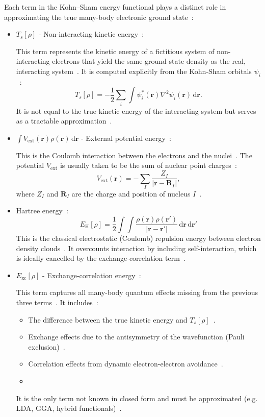 Each term in the Kohn--Sham energy functional plays a distinct role in approximating the true many-body electronic ground state~\nocite{}:
\begin{itemize}
    \item $T_s[\rho]$ - Non-interacting kinetic energy~\nocite{}:

    This term represents the kinetic energy of a fictitious system of non-interacting electrons that yield the same ground-state density as the real, interacting system~\nocite{}.
    It is computed explicitly from the Kohn-Sham orbitals $\psi_i$~\nocite{}:
    \begin{equation}
        T_s[\rho] = -\frac{1}{2} \sum_i \int \psi_i^*(\mathbf{r}) \nabla^2 \psi_i(\mathbf{r}) \, \mathrm{d}\mathbf{r}.
    \end{equation}
    It is not equal to the true kinetic energy of the interacting system but serves as a tractable approximation~\nocite{}.
    \item $\int V_{\mathrm{ext}}(\mathbf{r}) \rho(\mathbf{r}) \, \mathrm{d}\mathbf{r}$ - External potential energy~\nocite{}:

    This is the Coulomb interaction between the electrons and the nuclei~\nocite{}.
    The potential $V_{\mathrm{ext}}$ is usually taken to be the sum of nuclear point charges~\nocite{}:
    \begin{equation}
        V_{\mathrm{ext}}(\mathbf{r}) = -\sum_I \frac{Z_I}{|\mathbf{r} - \mathbf{R}_I|},
    \end{equation}
    where $Z_I$ and $\mathbf{R}_I$ are the charge and position of nucleus $I$~\nocite{}.
    \item Hartree energy~\nocite{}:
    \begin{equation}
        E_{\mathrm{H}}[\rho] = \frac{1}{2} \int \int \frac{\rho(\mathbf{r}) \rho(\mathbf{r'})}{|\mathbf{r} - \mathbf{r'}|} \, \mathrm{d}\mathbf{r} \, \mathrm{d}\mathbf{r'}
    \end{equation}
    This is the classical electrostatic (Coulomb) repulsion energy between electron density clouds~\nocite{}.
    It overcounts interaction by including self-interaction, which is ideally cancelled by the exchange-correlation term~\nocite{}.
    \item $E_{\mathrm{xc}}[\rho]$ - Exchange-correlation energy~\nocite{}:

    This term captures all many-body quantum effects missing from the previous three terms~\nocite{}.
    It includes~\nocite{}:
    \begin{itemize}
        \item The difference between the true kinetic energy and $T_s[\rho]$~\nocite{}.
        \item Exchange effects due to the antisymmetry of the wavefunction (Pauli exclusion)~\nocite{}.
        \item Correlation effects from dynamic electron-electron avoidance~\nocite{}.
    \item \end{itemize}
    It is the only term not known in closed form and must be approximated (e.g. LDA, GGA, hybrid functionals)~\nocite{}.
\end{itemize}

